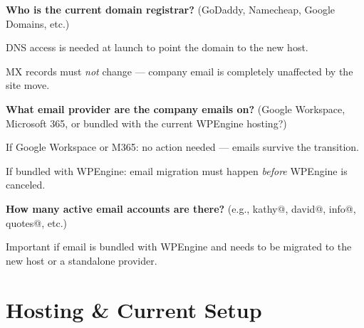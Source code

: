 \documentclass[11pt, letterpaper]{article}
\begin{document}
\begin{checklist}
  \item \textbf{Who is the current domain registrar?}
    (GoDaddy, Namecheap, Google Domains, etc.)
    \begin{checklist}
      \item DNS access is needed at launch to point the domain to the new host.
      \item MX records must \emph{not} change --- company email is completely
            unaffected by the site move.
    \end{checklist}

  \item \textbf{What email provider are the company emails on?}
    (Google Workspace, Microsoft 365, or bundled with the current WPEngine hosting?)
    \begin{checklist}
      \item If Google Workspace or M365: no action needed --- emails survive the transition.
      \item If bundled with WPEngine: email migration must happen \emph{before}
            WPEngine is canceled.
    \end{checklist}

  \item \textbf{How many active email accounts are there?}
    (e.g., kathy@, david@, info@, quotes@, etc.)
    \begin{checklist}
      \item Important if email is bundled with WPEngine and needs to be migrated
            to the new host or a standalone provider.
    \end{checklist}
\end{checklist}

\section{Hosting \& Current Setup}
\end{document}
